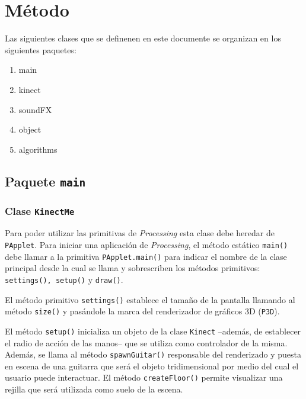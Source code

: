 \documentclass[10pt,a4paper]{report}
\begin{document}
	\section{Método}
	Las siguientes clases que se definenen en este documente se organizan en los siguientes paquetes:
	\begin{enumerate}
		\item main
		\item kinect
		\item soundFX
		\item object
		\item algorithms
	\end{enumerate}

	\subsection{Paquete \texttt{main}}
	\subsubsection{Clase \texttt{KinectMe}}\label{class:kinectme}
	Para poder utilizar las primitivas de \textit{Processing} esta clase debe heredar de \texttt{PApplet}. Para iniciar una aplicación de \textit{Processing}, el método estático \texttt{main()} debe llamar a la primitiva \texttt{PApplet.main()} para indicar el nombre de la clase principal desde la cual se llama y sobrescriben los métodos primitivos: \texttt{settings(), setup()} y \texttt{draw()}.
	
	
	
	El método primitivo \texttt{settings()} establece el tamaño de la pantalla llamando al método \texttt{size()} y pasándole la marca del renderizador de gráficos 3D (\texttt{P3D}).
	
	
	
	El método \texttt{setup()} inicializa un objeto de la clase \texttt{Kinect} --además, de establecer el radio de acción de las manos-- que se utiliza como controlador de la misma. Además, se llama al método \texttt{spawnGuitar()} responsable del renderizado y puesta en escena de una guitarra que será el objeto tridimensional por medio del cual el usuario puede interactuar. El método \texttt{createFloor()} permite visualizar una rejilla que será utilizada como suelo de la escena.
	
	
	
\end{document}

